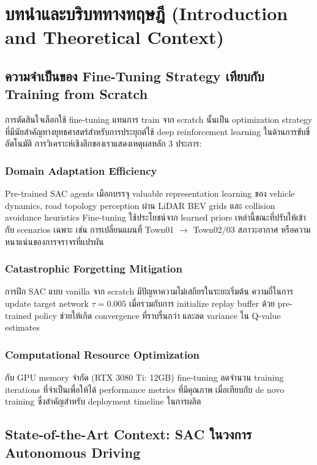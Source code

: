 \documentclass[10pt,a4paper,twocolumn]{article}
\begin{document}
\section{บทนำและบริบททางทฤษฎี (Introduction and Theoretical Context)}

\subsection{ความจำเป็นของ Fine-Tuning Strategy เทียบกับ Training from Scratch}

การตัดสินใจเลือกใช้ fine-tuning แทนการ train จาก scratch นั้นเป็น optimization strategy ที่มีนัยสำคัญทางยุทธศาสตร์สำหรับการประยุกต์ใช้ deep reinforcement learning ในด้านการขับขี่อัตโนมัติ การวิเคราะห์เชิงลึกของเราแสดงเหตุผลหลัก 3 ประการ:

\subsubsection{Domain Adaptation Efficiency}
Pre-trained SAC agents เมือกบรรจุ valuable representation learning ของ vehicle dynamics, road topology perception ผ่าน LiDAR BEV grids และ collision avoidance heuristics Fine-tuning ใช้ประโยชน์จาก learned priors เหล่านี้ขณะที่ปรับให้เข้ากับ scenarios เฉพาะ เช่น การเปลี่ยนแผนที่ Town01 $\rightarrow$ Town02/03 สภาวะอากาศ หรือความหนาแน่นของการจราจรที่แปรผัน

\subsubsection{Catastrophic Forgetting Mitigation}
การฝึก SAC แบบ vanilla จาก scratch มีปัญหาความไม่เสถียรในระยะเริ่มต้น ความถี่ในการ update target network $\tau = 0.005$ เมื่อรวมกับการ initialize replay buffer ด้วย pre-trained policy ช่วยให้เกิด convergence ที่ราบรื่นกว่า และลด variance ใน Q-value estimates

\subsubsection{Computational Resource Optimization}
กับ GPU memory จำกัด (RTX 3080 Ti: 12GB) fine-tuning ลดจำนวน training iterations ที่จำเป็นเพื่อให้ได้ performance metrics ที่มีคุณภาพ เมื่อเทียบกับ de novo training ซึ่งสำคัญสำหรับ deployment timeline ในการผลิต

\subsection{State-of-the-Art Context: SAC ในวงการ Autonomous Driving}
\end{document}
